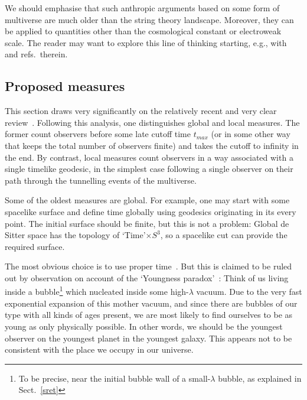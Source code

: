 \documentclass[12pt]{article}
\numberwithin{equation}{section}
\begin{document}
We should emphasise that such anthropic arguments based on some form of multiverse are much older than the string theory landscape. Moreover, they can be applied to quantities other than the cosmological constant or electroweak scale. The reader may want to explore this line of thinking starting, e.g., with \cite{bt, Hogan:1999wh, Tegmark:2005dy, Hall:2007ja} and refs.~therein.





\subsection{Proposed measures}
This section draws very significantly on the relatively recent and very clear review~\cite{Freivogel:2011eg}. Following this analysis, one distinguishes global and local measures. The former count observers before some late cutoff time $t_{max}$ (or in some other way that keeps the total number of observers finite) and takes the cutoff to infinity in the end. By contrast, local measures count observers in  a way associated with a single timelike geodesic, in the simplest case following a single observer on their path through the tunnelling events of the multiverse.

Some of the oldest measures are global. For example, one may start with some spacelike surface and define time globally using geodesics originating in its every point. The initial surface should be finite, but this is not a problem: Global de Sitter space has the topology of `Time'$\times S^3$, so a spacelike cut can provide the required surface.

The most obvious choice is to use proper time~\cite{Linde:1993nz}. But this is claimed to be ruled out by observation on account of the `Youngness paradox'~\cite{Linde:1993xx}: Think of us living inside a bubble\footnote{
To 
be precise, near the initial bubble wall of a small-$\lambda$ bubble, as explained in Sect.~\ref{sret}
}
which nucleated inside some high-$\lambda$ vacuum. Due to the very fast exponential expansion of this mother vacuum, and since there are bubbles of our type with all kinds of ages present, we are most likely to find ourselves to be as young as only physically possible. In other words, we should be the youngest observer on the youngest planet in the youngest galaxy. This appears not to be consistent with the place we occupy in our universe.
\end{document}
